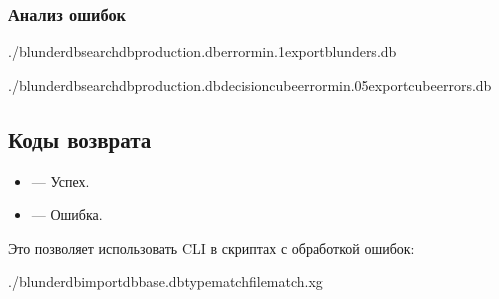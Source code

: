 \documentclass[letterpaper,10pt,russian]{sphinxmanual}
\begin{document}
\subsubsection{Анализ ошибок}
\label{\detokenize{cli:analyse-des-erreurs}}
\begin{sphinxVerbatim}[commandchars=\\\{\}]
./blunderdbsearch\PYGZhy{}\PYGZhy{}dbproduction.db\PYGZhy{}\PYGZhy{}error\PYGZhy{}min.1\PYGZhy{}\PYGZhy{}exportblunders.db

./blunderdbsearch\PYGZhy{}\PYGZhy{}dbproduction.db\PYGZhy{}\PYGZhy{}decisioncube\PYGZhy{}\PYGZhy{}error\PYGZhy{}min.05\PYGZhy{}\PYGZhy{}exportcube\PYGZus{}errors.db
\end{sphinxVerbatim}


\subsection{Коды возврата}
\label{\detokenize{cli:codes-de-retour}}\begin{itemize}
\item {} 
\sphinxAtStartPar
{} — Успех.

\item {} 
\sphinxAtStartPar
{} — Ошибка.

\end{itemize}

\sphinxAtStartPar
Это позволяет использовать CLI в скриптах с обработкой ошибок:

\begin{sphinxVerbatim}[commandchars=\\\{\}]
./blunderdbimport\PYGZhy{}\PYGZhy{}dbbase.db\PYGZhy{}\PYGZhy{}typematch\PYGZhy{}\PYGZhy{}filematch.xg
\end{sphinxVerbatim}
\end{document}
